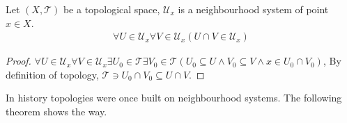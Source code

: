 \documentclass[openany]{book}
\begin{document}
\begin{theorem}
Let $(X,\mathscr T)$ be a topological space, $\mathscr U_x$ is a neighbourhood system of point $x\in X$.
\begin{align*}
	\forall U\in \mathscr U_x\forall V\in \mathscr U_x( U\cap V\in \mathscr U_x)
\end{align*}
\end{theorem}
\begin{proof}
$\forall U\in \mathscr U_x\forall V\in \mathscr U_x\exists U_0\in \mathscr T\exists V_0\in \mathscr T(U_0\subseteq U\wedge V_0\subseteq V\wedge x\in U_0\cap V_0 )$, By definition of topology, $\mathscr T\ni U_0\cap V_0\subseteq U\cap V$. 
\end{proof}

In history topologies were once built on neighbourhood systems. The following theorem shows the way.
 
\end{document}
